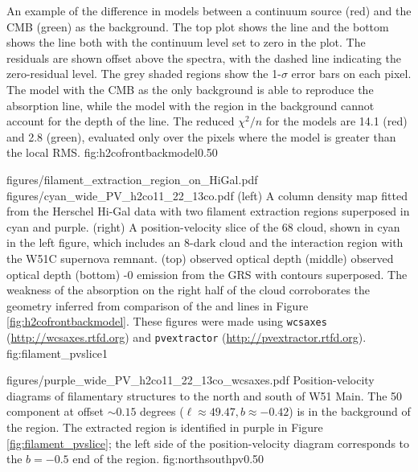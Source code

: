 {An example of the difference in models between a continuum source (red) and
the CMB (green) as the background.  The top plot shows the \oneone line and the
bottom shows the \twotwo line both with the continuum level set to zero in the
plot.  The residuals are shown
offset above the spectra, with the dashed line indicating the zero-residual
level.  The grey shaded regions show the 1-$\sigma$ error bars on each pixel.
The model with the CMB as the only
background is able to reproduce the absorption line, while the model with the
\hii region in the background cannot account for the depth of the \twotwo line.
The reduced $\chi^2/n$ for the models are 14.1 (red) and 2.8 (green), evaluated
only over the pixels where the model is greater than the local RMS.}
{fig:h2cofrontbackmodel}{0.5}{0}

\FigureTwo
{figures/filament_extraction_region_on_HiGal.pdf}
{figures/cyan_wide_PV_h2co11_22_13co.pdf}
{(left) A column density map fitted from the Herschel Hi-Gal data with two
filament extraction regions superposed in cyan and purple.
(right) A position-velocity slice of the 68 \kms cloud, shown in cyan in the
left figure, which includes an 8\um-dark cloud and the interaction region
with the W51C supernova remnant.
(top) \formaldehyde \oneone observed optical depth
(middle) \formaldehyde \twotwo observed optical depth
(bottom) -0 emission from the GRS with \formaldehyde \oneone
contours superposed.  The weakness of the \formaldehyde absorption on the right
half of the cloud corroborates the geometry inferred from comparison of the \oneone
and \twotwo lines in Figure \ref{fig:h2cofrontbackmodel}.
These figures were made using \texttt{wcsaxes} (\protect\url{http://wcsaxes.rtfd.org})
and \texttt{pvextractor} (\protect\url{http://pvextractor.rtfd.org}).
}
{fig:filament_pvslice}{1}%


\Figure
{figures/purple_wide_PV_h2co11_22_13co_wcsaxes.pdf}
{Position-velocity diagrams of filamentary structures to the north and south of
W51 Main.  The 50 \kms component at offset $\sim0.15$ degrees
($\ell\approx49.47, b\approx-0.42$) is in the background of the \hii region.
The extracted region is identified in purple in Figure
\ref{fig:filament_pvslice}; the left side of the position-velocity diagram
corresponds to the $b=-0.5$ end of the region.}
{fig:northsouthpv}{0.5}{0}

